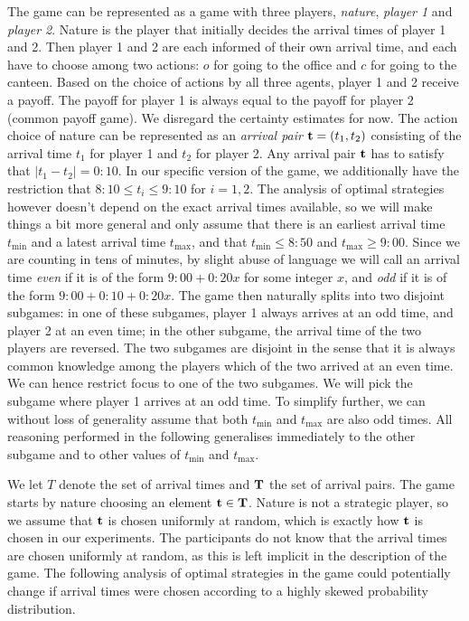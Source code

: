 \documentclass[twocolumn,a4paper,superscriptaddress,nofootinbib]{revtex4}
\newcommand{\tmin}{t_{\min}}
\newcommand{\tmax}{t_{\max}}
\begin{document}
The game can be represented as a game with three players, \emph{nature}, \emph{player 1} and \emph{player 2}. Nature is the player that initially decides the arrival times of player 1 and 2. Then player 1 and 2 are each informed of their own arrival time, and each have to choose among two actions: $o$ for going to the office and $c$ for going to the canteen. Based on the choice of actions by all three agents, player 1 and 2 receive a payoff. The payoff for player 1 is always equal to the payoff for player 2 (common payoff game). We  disregard the certainty estimates for now. The action choice of nature can be represented as an \emph{arrival pair} ${\bf t} = (t_1,t_2)$ consisting of the arrival time $t_1$ for player 1 and $t_2$ for player 2. Any arrival pair $\bf t$ has to satisfy that  $| t_1 - t_2 | = 0{:}10$. In our specific version of the game, we additionally have the restriction that $8{:}10 \leq t_i \leq 9{:}10$ for $i = 1,2$. The analysis of optimal strategies however doesn't depend on the exact arrival times available, so we will make things a bit more general and only assume that there is an earliest arrival time $\tmin$ and a latest arrival time $\tmax$, and that $\tmin \leq 8{:}50$ and $\tmax \geq 9{:}00$. Since we are counting in tens of minutes, by slight abuse of language we will call an arrival time \emph{even} if it is of the form $9{:}00+0{:}20x$ for some integer $x$, and \emph{odd} if it is of the form $9{:}00+0{:}10+0{:}20x$. The game then naturally splits into two disjoint subgames: in one of these subgames, player 1 always arrives at an odd time, and player 2 at an even time; 
 in the other subgame, the arrival time of the two players are reversed. The two subgames are disjoint in the sense that it is always common knowledge among the players which of the two arrived at an even time. We can hence restrict focus to one of the two subgames. We will pick the subgame where player 1 arrives at an odd time. To simplify further, we can without loss of generality assume that both $\tmin$ and $\tmax$ are also odd times. All reasoning performed in the following generalises immediately to the other subgame and to other values of $\tmin$ and $\tmax$. 
 
We let $T$ denote the set of arrival times and $\bf T$ the set of arrival pairs.  
The game starts by nature choosing an element $\mathbf{t} \in \bf T$. Nature is not a strategic player, so we assume that $\bf t$ is chosen uniformly at random, which is exactly how $\bf t$ is chosen in our experiments. The participants do not know that the arrival times are chosen uniformly at random, as this is left implicit in the description of the game. The following analysis of optimal strategies in the game could potentially change if arrival times were chosen according to a highly skewed probability distribution.
\end{document}
